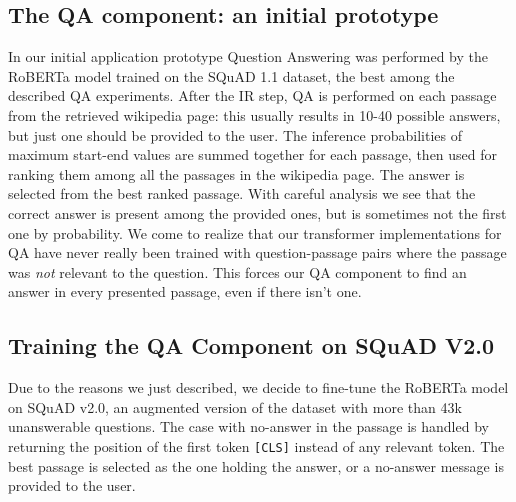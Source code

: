 \documentclass{article}
\newcommand{\code}[1]{\colorbox{light-gray}{\texttt{#1}}}
\begin{document}
\subsection{The QA component: an initial prototype}
In our initial application prototype Question Answering was performed by the RoBERTa model trained on the SQuAD 1.1 dataset, the best among the described QA experiments. After the IR step, QA is performed on each passage from the retrieved wikipedia page: this usually results in 10-40 possible answers, but just one should be provided to the user. The inference probabilities of maximum start-end values are summed together for each passage, then used for ranking them among all the passages in the wikipedia page. The answer is selected from the best ranked passage.
With careful analysis we see that the correct answer is present among the provided ones, but is sometimes not the first one by probability.
We come to realize that our transformer implementations for QA have never really been trained with question-passage pairs where the passage was \textit{not} relevant to the question. This forces our QA component to find an answer in every presented passage, even if there isn't one.

\subsection{Training the QA Component on SQuAD V2.0}

Due to the reasons we just described, we decide to fine-tune the RoBERTa model on SQuAD v2.0, an augmented version of the dataset with more than 43k unanswerable questions. The case with no-answer in the passage is handled by returning the position of the first token \code{[CLS]} instead of any relevant token. The best passage is selected as the one holding the answer, or a no-answer message is provided to the user.
\end{document}

